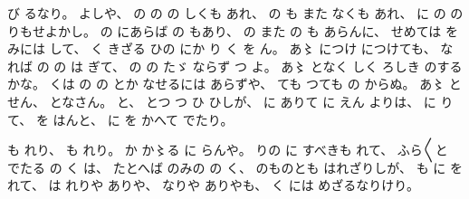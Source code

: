 び
るなり。
%
よしや、
%
の
の
の
しくも
あれ、
%
の
も
また
なくも
あれ、
%
に
の
の
りもせよかし。
%
の
にあらば
の
もあり、
%
の
また
の
も
あらんに、
%
せめては
を
%
みには
して、
%
く
きざる
ひの
にか
り
く
を
ん。
%
あ〻%
につけ
につけても、
%
なれば
の
の
は
ぎて、
%
の
の
たゞ%
ならず
つ
よ。
%
あ〻%
となく
しく
ろしき
のするかな。
%
くは
の
の
とか
なせるには
あらずや、
%
ても
つても
の%
からぬ。
%
あ〻%
とせん、
%
となさん。
%
と、
%
とつ
つ
ひ
ひしが、
%
に%
ありて
に
えん
よりは、
%
に
りて、
%
を
はんと、%
%
に
を
かへて
でたり。

%
も
れり、
%
も
れり。
%
か
か〻る%
に
らんや。
%
りの
に
すべきも
れて、
%
ふら〳〵と
でたる
の
く
は、
%
たとへば
のみの
の
く、
%
のものとも
はれざりしが、
%
も
に
を
れて、
%
は
れりや
ありや、
%
なりや
ありやも、
%
く
には%
めざるなりけり。
